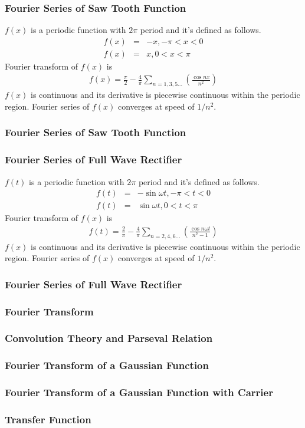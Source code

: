 \documentclass{beamer}
\begin{document}
\begin{frame}
\frametitle{Fourier Series of Saw Tooth Function}
$f(x)$ is a periodic function with $2\pi$ period and it's defined as follows.
\begin{eqnarray}
f(x)&=& -x, -\pi < x < 0 \nonumber \\
f(x)&=& x, 0 < x < \pi
\label{eq:sawfunc}
\end{eqnarray}
Fourier transform of $f(x)$ is
\begin{eqnarray}
f(x)= \frac{\pi}{2} - \frac{4}{\pi} \sum_{n=1,3,5...} \left( \frac{\cos nx}{n^2} \right)
\label{eq:sawfunc_ft}
\end{eqnarray}
$f(x)$ is continuous and its derivative is piecewise continuous within the periodic region. Fourier series of $f(x)$ converges at speed of $1/n^2$.
\end{frame}
\begin{frame}
\frametitle{Fourier Series of Saw Tooth Function}
\end{frame}
\begin{frame}
\frametitle{Fourier Series of Full Wave Rectifier}
$f(t)$ is a periodic function with $2\pi$ period and it's defined as follows.
\begin{eqnarray}
f(t)&=& -\sin {\omega t}, -\pi < t < 0 \nonumber \\
f(t)&=& \sin {\omega t}, 0 < t < \pi
\label{eq:fullrectifier_func}
\end{eqnarray}
Fourier transform of $f(x)$ is
\begin{eqnarray}
f(t)= \frac{2}{\pi} - \frac{4}{\pi} \sum_{n=2,4,6...} \left( \frac{\cos n\omega t}{n^2 - 1} \right)
\label{eq:fullrectifier_func_ft}
\end{eqnarray}
$f(x)$ is continuous and its derivative is piecewise continuous within the periodic region. Fourier series of $f(x)$ converges at speed of $1/n^2$.
\end{frame}
\begin{frame}
\frametitle{Fourier Series of Full Wave Rectifier}
\end{frame}
\begin{frame}
\frametitle{Fourier Transform}

\end{frame}
\begin{frame}
\frametitle{Convolution Theory and Parseval Relation}
\end{frame}
\begin{frame}
\frametitle{Fourier Transform of a Gaussian Function}
\end{frame}
\begin{frame}
\frametitle{Fourier Transform of a Gaussian Function with Carrier}
\end{frame}
\begin{frame}
\frametitle{Transfer Function}
\end{frame}
\end{document}

